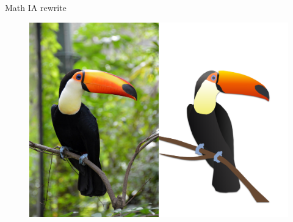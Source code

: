 \documentclass{article}
\begin{document}
Math IA rewrite

\begin{figure}
\includegraphics[width=\linewidth]{figures/figure01.png}
\end{figure}
\end{document}
